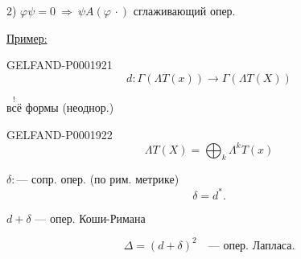 2) $\varphi\psi=0\ \Rightarrow\ \psi A(\varphi\,\cdot)$ сглаживающий опер.





\par\noindent\begin{minipage}{\linewidth}
\underline{Пример:}



\begin{GelfandAdjacentEvidence}{GELFAND-P000192}{1}
\begin{equation*}
d\colon\Gamma(\Lambda T(x))\longrightarrow\Gamma(\Lambda T(X))
\end{equation*}
\end{GelfandAdjacentEvidence}
\end{minipage}\par


$\overset{!}{\text{всё}}$ формы (неоднор.)



\begin{GelfandAdjacentEvidence}{GELFAND-P000192}{2}
\begin{equation*}
\Lambda T(X)=\bigoplus_k\Lambda^kT(x)
\end{equation*}
\end{GelfandAdjacentEvidence}

$\delta\colon$\quad — сопр. опер. (по рим. метрике)
\begin{equation*}\delta=d^*.\end{equation*}



$d+\delta$ — опер. Коши-Римана



\begin{equation*}
\Delta=(d+\delta)^2\quad\text{— опер. Лапласа.}
\end{equation*}




